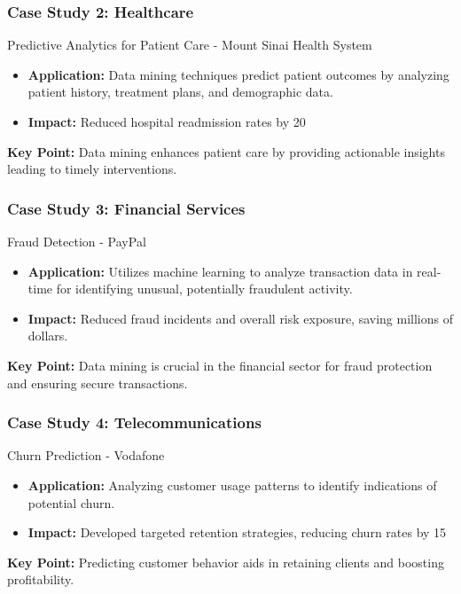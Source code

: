 \documentclass[aspectratio=169]{beamer}
\begin{document}
\begin{frame}[fragile]
    \frametitle{Case Study 2: Healthcare}
    \begin{block}{Predictive Analytics for Patient Care - Mount Sinai Health System}
        \begin{itemize}
            \item \textbf{Application:} Data mining techniques predict patient outcomes by analyzing patient history, treatment plans, and demographic data.
            \item \textbf{Impact:} Reduced hospital readmission rates by 20%
        \end{itemize}
        \textbf{Key Point:} Data mining enhances patient care by providing actionable insights leading to timely interventions.
    \end{block}
\end{frame}

\begin{frame}[fragile]
    \frametitle{Case Study 3: Financial Services}
    \begin{block}{Fraud Detection - PayPal}
        \begin{itemize}
            \item \textbf{Application:} Utilizes machine learning to analyze transaction data in real-time for identifying unusual, potentially fraudulent activity.
            \item \textbf{Impact:} Reduced fraud incidents and overall risk exposure, saving millions of dollars.
        \end{itemize}
        \textbf{Key Point:} Data mining is crucial in the financial sector for fraud protection and ensuring secure transactions.
    \end{block}
\end{frame}

\begin{frame}[fragile]
    \frametitle{Case Study 4: Telecommunications}
    \begin{block}{Churn Prediction - Vodafone}
        \begin{itemize}
            \item \textbf{Application:} Analyzing customer usage patterns to identify indications of potential churn.
            \item \textbf{Impact:} Developed targeted retention strategies, reducing churn rates by 15%
        \end{itemize}
        \textbf{Key Point:} Predicting customer behavior aids in retaining clients and boosting profitability.
    \end{block}
\end{frame}
\end{document}
